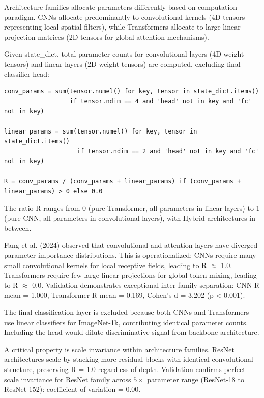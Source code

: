 Architecture families allocate parameters differently based on computation paradigm. CNNs allocate predominantly to convolutional kernels (4D tensors representing local spatial filters), while Transformers allocate to large linear projection matrices (2D tensors for global attention mechanisms).

Given state\_dict, total parameter counts for convolutional layers (4D weight tensors) and linear layers (2D weight tensors) are computed, excluding final classifier head:

\begin{verbatim}
conv_params = sum(tensor.numel() for key, tensor in state_dict.items() 
                  if tensor.ndim == 4 and 'head' not in key and 'fc' not in key)

linear_params = sum(tensor.numel() for key, tensor in state_dict.items() 
                    if tensor.ndim == 2 and 'head' not in key and 'fc' not in key)

R = conv_params / (conv_params + linear_params) if (conv_params + linear_params) > 0 else 0.0
\end{verbatim}

The ratio R ranges from 0 (pure Transformer, all parameters in linear layers) to 1 (pure CNN, all parameters in convolutional layers), with Hybrid architectures in between.

Fang et al. (2024) observed that convolutional and attention layers have diverged parameter importance distributions. This is operationalized: CNNs require many small convolutional kernels for local receptive fields, leading to R $\approx$ 1.0. Transformers require few large linear projections for global token mixing, leading to R $\approx$ 0.0. Validation demonstrates exceptional inter-family separation: CNN R mean = 1.000, Transformer R mean = 0.169, Cohen's d = 3.202 (p < 0.001).

The final classification layer is excluded because both CNNs and Transformers use linear classifiers for ImageNet-1k, contributing identical parameter counts. Including the head would dilute discriminative signal from backbone architecture.

A critical property is scale invariance within architecture families. ResNet architectures scale by stacking more residual blocks with identical convolutional structure, preserving R = 1.0 regardless of depth. Validation confirms perfect scale invariance for ResNet family across $5\times$ parameter range (ResNet-18 to ResNet-152): coefficient of variation = 0.00.

